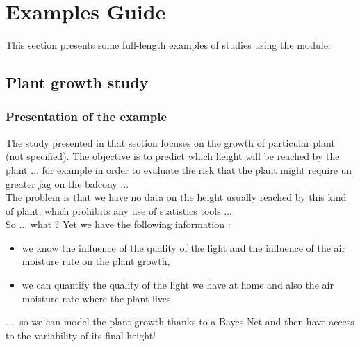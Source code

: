 



\section{Examples Guide}

This section presents some full-length examples of studies using the module.


\subsection{Plant growth study}

\subsubsection{Presentation of the example}

The study presented in that section focuses on the growth of particular plant (not specified). The objective is to predict which height will be reached by the plant ... for example in order to evaluate the risk that the plant might require un greater jag on the balcony ...\\

The problem is that we have no data on the height usually reached by this kind of plant, which prohibits any use of statistics tools ...\\
So ... what ? Yet we have the following information :
\begin{itemize}
   \item we know the influence of the quality of the light and the influence of the air moisture rate on the plant growth,
   \item we can quantify the quality of the light we have at home and also the air moisture rate where the plant lives.
\end{itemize}
.... so we can model the plant growth thanks to a Bayes Net and then have access to the variability of its final height!\\


